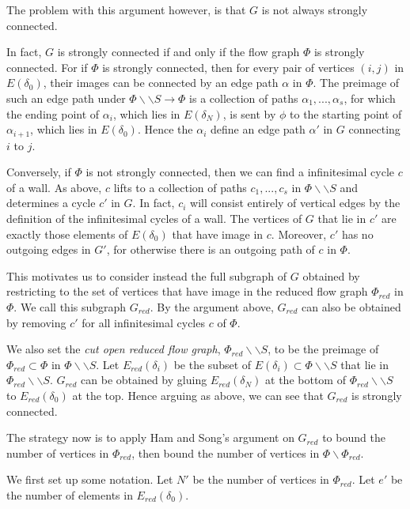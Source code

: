 \documentclass[12pt]{amsart}
\theoremstyle{definition}
\numberwithin{equation}{section}
\begin{document}
The problem with this argument however, is that $G$ is not always strongly connected.

In fact, $G$ is strongly connected if and only if the flow graph $\Phi$ is strongly connected. For if $\Phi$ is strongly connected, then for every pair of vertices $(i,j)$ in $E(\delta_0)$, their images can be connected by an edge path $\alpha$ in $\Phi$. The preimage of such an edge path under $\Phi \backslash \backslash S \to \Phi$ is a collection of paths $\alpha_1,...,\alpha_s$, for which the ending point of $\alpha_i$, which lies in $E(\delta_N)$, is sent by $\phi$ to the starting point of $\alpha_{i+1}$, which lies in $E(\delta_0)$. Hence the $\alpha_i$ define an edge path $\alpha'$ in $G$ connecting $i$ to $j$.

Conversely, if $\Phi$ is not strongly connected, then we can find a infinitesimal cycle $c$ of a wall. As above, $c$ lifts to a collection of paths $c_1,...,c_s$ in $\Phi \backslash \backslash S$ and determines a cycle $c'$ in $G$. In fact, $c_i$ will consist entirely of vertical edges by the definition of the infinitesimal cycles of a wall. The vertices of $G$ that lie in $c'$ are exactly those elements of $E(\delta_0)$ that have image in $c$. Moreover, $c'$ has no outgoing edges in $G'$, for otherwise there is an outgoing path of $c$ in $\Phi$.

This motivates us to consider instead the full subgraph of $G$ obtained by restricting to the set of vertices that have image in the reduced flow graph $\Phi_{red}$ in $\Phi$. We call this subgraph $G_{red}$. By the argument above, $G_{red}$ can also be obtained by removing $c'$ for all infinitesimal cycles $c$ of $\Phi$. 

We also set the \textit{cut open reduced flow graph}, $\Phi_{red} \backslash \backslash S$, to be the preimage of $\Phi_{red} \subset \Phi$ in $\Phi \backslash \backslash S$. Let $E_{red}(\delta_i)$ be the subset of $E(\delta_i) \subset \Phi \backslash \backslash S$ that lie in $\Phi_{red} \backslash \backslash S$. $G_{red}$ can be obtained by gluing $E_{red}(\delta_N)$ at the bottom of $\Phi_{red} \backslash \backslash S$ to $E_{red}(\delta_0)$ at the top. Hence arguing as above, we can see that $G_{red}$ is strongly connected.

The strategy now is to apply Ham and Song's argument on $G_{red}$ to bound the number of vertices in $\Phi_{red}$, then bound the number of vertices in $\Phi \backslash \Phi_{red}$. 

We first set up some notation. Let $N'$ be the number of vertices in $\Phi_{red}$. Let $e'$ be the number of elements in $E_{red}(\delta_0)$.
\end{document}
